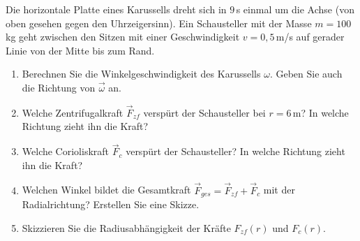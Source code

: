 \begin{ExerciseBlock}
Die horizontale Platte eines Karussells dreht sich in $9\,$s einmal um die Achse (von oben gesehen gegen den Uhrzeigersinn). Ein Schausteller mit der Masse $m=100\,$kg geht zwischen den Sitzen mit einer Geschwindigkeit $v=0,5\,$m/s auf gerader Linie von der Mitte bis zum Rand.

\begin{enumerate}
	\item Berechnen Sie die Winkelgeschwindigkeit des Karussells $\omega$. Geben Sie auch die Richtung von $\vec{\omega}$ an.

	\item Welche Zentrifugalkraft $\vec{F}_{zf}$ verspürt der Schausteller bei $r = 6\,$m? In welche Richtung zieht ihn die Kraft?

	\item Welche Corioliskraft $\vec{F}_{c}$ verspürt der Schausteller? In welche Richtung zieht ihn die Kraft?

	\item Welchen Winkel bildet die Gesamtkraft $\vec{F}_{ges} =  \vec{F}_{zf}  +\vec{F}_{c}$ mit der Radialrichtung? Erstellen Sie eine Skizze.

	\item Skizzieren Sie die Radiusabhängigkeit der Kräfte $F_{zf}(r)$ und $F_{c}(r)$.

\end{enumerate}
\end{ExerciseBlock}
